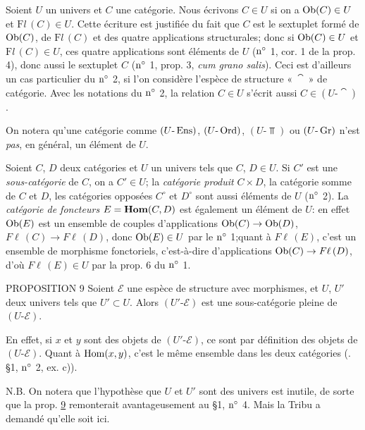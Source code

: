 \documentclass[10pt]{../fichiers-configuration-latex/smfart}
\begin{document}
Soient $U$ un univers et $C$ une catégorie. Nous écrivons $C\in U$
si on a $\operatorname{Ob}(C)\in U$ et $%
\mathrm{F}{}l\, (C)\in U$. Cette écriture est justifiée du fait que
$C$ est le sextuplet formé de $\operatorname{Ob}(C)$, de
$\mathrm{F}{}l\,(C)$ et des quatre applications structurales; donc
si $\operatorname{Ob}(C)\in U$ et
$\mathrm{F}{}l\,(C)\in U$, ces quatre applications sont éléments de
$U$ (${\rm n^{\circ}}$ 1, cor. 1 de la prop. 4), donc aussi le
sextuplet $C$ (${\rm n^{\circ}}$ 1, prop. 3, \textit{cum grano
salis}). Ceci est d'ailleurs un cas particulier du ${\rm n^{\circ}}$
2, si l'on considère l'espèce de structure « $\cat$ » de catégorie.
Avec les notations du ${\rm n^{\circ}}$ 2, la relation $C\in U$
s'écrit aussi $C\in (U\text{-}\cat)$.

On notera qu'une catégorie comme $(U\text{-}\operatorname{Ens})$,
$(U\text{-}\operatorname{Ord})$, $(U\text{-}\Top)$ ou $(U\text{-}\operatorname{Gr})$ n'est
\emph{pas}, en général, un élément de $U$.

Soient $C$, $D$ deux catégories et $U$ un univers tels que $C$,
$D\in U$. Si $C'$ est une \emph{sous-catégorie} de $C$, on a $C'\in
U$; la \emph{catégorie produit} $C\times D$, la catégorie somme de
$C$ et $D$, les catégories opposées $C^{\circ}$ et $D^{\circ}$ sont
aussi éléments de $U$ (\cf ${\rm n^{\circ}}$ 2). La \emph{catégorie
de foncteurs} $E=\operatorname{\mathbf{Hom}}(C,D)$ est également un élément de $U$: en
effet $\operatorname{Ob}(E)$ est un ensemble de couples d'applications
$\operatorname{Ob}(C)\rightarrow \operatorname{Ob}(D)$, $F\ell\, (C)\rightarrow F\ell\, (D)$,
donc $\operatorname{Ob}(E)\in U$ par le ${\rm n^{\circ}}$ 1;\pageoriginale quant à
$F\ell\, (E)$, c'est un ensemble de morphisme fonctoriels,
c'est-à-dire d'applications $\operatorname{Ob}(C)\rightarrow F\ell\, (D)$, d'où $
F\ell\, (E)\in U$ par la prop. 6 du ${\rm n^{\circ}}$ 1.

\begin{enonce*}{PROPOSITION 9}
Soient $\mathcal{E}$ une espèce de structure avec morphismes, et
$U$, $U'$ deux univers tels que $U'\subset U$. Alors
$(U'\text{-}\mathcal{E})$ est une sous-catégorie pleine de
$(U\text{-}\mathcal{E})$.
\end{enonce*}

En effet, si $x$ et $y$ sont des objets de
$(U'\text{-}\mathcal{E})$, ce sont par définition des objets de
$(U\text{-}\mathcal{E})$. Quant à $\operatorname{Hom}(x,y)$, c'est le même
ensemble dans les deux catégories (\cf. \S 1, ${\rm n^{\circ}}$ 2,
ex. c)).

N.B. On notera que l'hypothèse que $U$ et $U'$ sont des univers %
est inutile, de sorte que la prop. \hyperref[I.sec9]{9} remonterait avantageusement au
\S 1, ${\rm n^{\circ}}$ 4. Mais la Tribu a demandé qu'elle soit ici.
\end{document}
